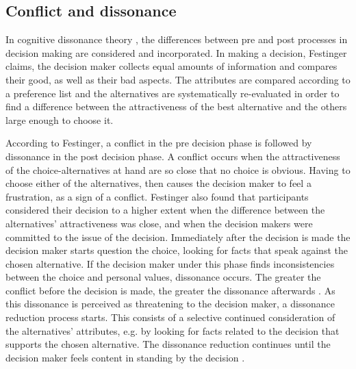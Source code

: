 \documentclass[jou,draftfirst,11pt]{apa6}
\begin{document}
\subsection{Conflict and dissonance}

In cognitive dissonance theory \parencite{festinger64}, the differences
between pre and post processes in decision making are considered and
incorporated.  In making a decision, Festinger claims, the decision
maker collects equal amounts of information and compares their good,
as well as their bad aspects.  The attributes are compared according
to a preference list and the alternatives are systematically
re-evaluated in order to find a difference between the attractiveness
of the best alternative and the others large enough to choose it.

According to Festinger, a conflict in the pre decision phase is
followed by dissonance in the post decision phase.  A conflict occurs
when the attractiveness of the choice-alternatives at hand are so
close that no choice is obvious.  Having to choose either of the
alternatives, then causes the decision maker to feel a frustration, as
a sign of a conflict.  Festinger also found that participants
considered their decision to a higher extent when the difference
between the alternatives' attractiveness was close, and when the
decision makers were committed to the issue of the decision.
Immediately after the decision is made the decision maker starts
question the choice, looking for facts that speak against the chosen
alternative.  If the decision maker under this phase finds
inconsistencies between the choice and personal values, dissonance
occurs.  The greater the conflict before the decision is made, the
greater the dissonance afterwards \parencite{festinger64}.  As this
dissonance is perceived as threatening to the decision maker, a
dissonance reduction process starts.  This consists of a selective
continued consideration of the alternatives' attributes, e.g. by
looking for facts related to the decision that supports the chosen
alternative.  The dissonance reduction continues until the decision
maker feels content in standing by the decision
\parencite{festinger64}.
\end{document}
